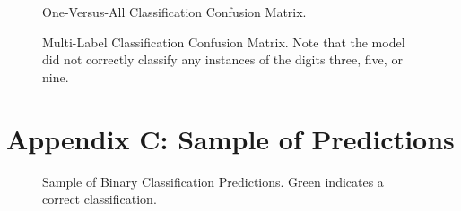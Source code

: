 \documentclass[]{article}
\begin{document}
\begin{figure}[h!]
	\centering
	\caption{One-Versus-All Classification Confusion Matrix.}
\end{figure}

\begin{figure}[h!]
	\centering
	\caption{Multi-Label Classification Confusion Matrix. Note that the model did not correctly classify any instances of the digits three, five, or nine.}
\end{figure}
\clearpage

\newpage
\section*{Appendix C: Sample of Predictions}

\begin{figure}[h!]
	\centering
	\caption{Sample of Binary Classification Predictions. Green indicates a correct classification.}
\end{figure}
\end{document}
